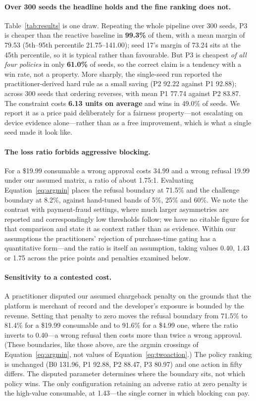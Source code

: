 \documentclass{article}
\begin{document}
\paragraph{Over 300 seeds the headline holds and the fine ranking does not.}
Table~\ref{tab:results} is one draw. Repeating the whole pipeline over 300 seeds, P3 is
cheaper than the reactive baseline in \textbf{99.3\%} of them, with a mean margin of 79.53
(5th--95th percentile 21.75--141.00); seed 17's margin of 73.24 sits at the 45th
percentile, so it is typical rather than favourable. But P3 is cheapest \emph{of all four
policies} in only \textbf{61.0\%} of seeds, so the correct claim is a tendency with a win
rate, not a property. More sharply, the single-seed run reported the practitioner-derived
hard rule as a small saving (P2 92.22 against P1 92.88); across 300 seeds that ordering
reverses, with mean P1 77.74 against P2 83.87. The constraint costs \textbf{6.13 units on
average} and wins in 49.0\% of seeds. We report it as a price paid deliberately for a
fairness property---not escalating on device evidence alone---rather than as a free
improvement, which is what a single seed made it look like.

\paragraph{The loss ratio forbids aggressive blocking.} For a \$19.99 consumable a wrong
approval costs 34.99 and a wrong refusal 19.99 under our assumed matrix, a ratio of about
1.75:1. Evaluating Equation~\ref{eq:argmin} places the refusal boundary at 71.5\% and the
challenge boundary at 8.2\%, against hand-tuned bands of 5\%, 25\% and 60\%. We note the
contrast with payment-fraud settings, where much larger asymmetries are reported and
correspondingly low thresholds follow; we have no citable figure for that comparison and
state it as context rather than as evidence. Within our assumptions the practitioners'
rejection of purchase-time gating has a quantitative form---and the ratio is itself an
assumption, taking values 0.40, 1.43 or 1.75 across the price points and penalties
examined below.

\paragraph{Sensitivity to a contested cost.} A practitioner disputed our assumed
chargeback penalty on the grounds that the platform is merchant of record and the
developer's exposure is bounded by the revenue. Setting that penalty to zero moves the
refusal boundary from 71.5\% to 81.4\% for a \$19.99 consumable and to 91.6\% for a \$4.99
one, where the ratio inverts to 0.40---a wrong refusal then costs more than twice a wrong
approval. (These boundaries, like those above, are the argmin crossings of
Equation~\ref{eq:argmin}, not values of Equation~\ref{eq:twoaction}.) The policy ranking is
unchanged (B0 131.96, P1 92.88, P2 88.47, P3 80.97) and one action in fifty differs. The
disputed parameter determines where the boundary sits, not which policy wins. The only
configuration retaining an adverse ratio at zero penalty is the high-value consumable, at
1.43---the single corner in which blocking can pay.
\end{document}
